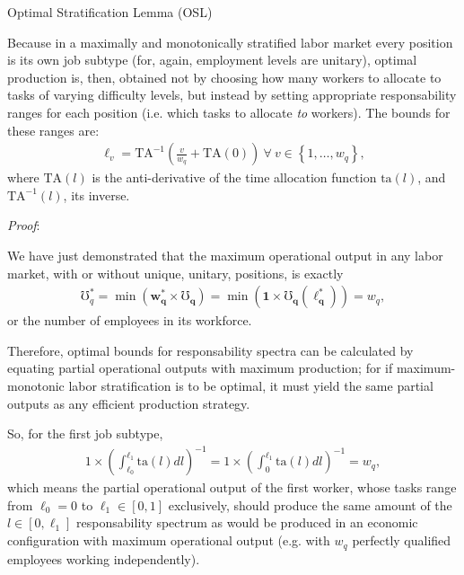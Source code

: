 \documentclass[hidelinks, nonatbib]{elsarticle}
\begin{document}
Optimal Stratification Lemma (OSL)

Because in a maximally and monotonically stratified labor market every position is its own job subtype (for, again, employment levels are unitary), optimal production is, then, obtained not by choosing how many workers to allocate to tasks of varying difficulty levels, but instead by setting appropriate responsability ranges for each position (i.e. which tasks to allocate \textit{to} workers). The bounds for these ranges are:
\begin{gather}
\ell_v
=
\text{TA}^{-1}\left(
    \frac{v}{w_q}
    +
    \text{TA}(0)
\right)
\
\forall
\
v \in 
\left\{
    1, \dots, w_q
\right\}
,
\end{gather}
where $\text{TA}(l)$ is the anti-derivative of the time allocation function $\text{ta}(l)$, and $\text{TA}^{-1}(l)$, its inverse.

\textit{Proof}:

We have just demonstrated that the maximum operational output in any labor market, with or without unique, unitary, positions, is exactly 
\begin{gather}
\mho_{q}^{*}
    =
    \min(
        \boldsymbol{w_{q}^{*}}
        \times
        \boldsymbol{\mho_q}
    )
    = 
    \min(
        \boldsymbol{1}
        \times
        \boldsymbol{\mho_q}(
            \boldsymbol{\ell_{q}^{*}}
        )
    )
    =
    w_q
,
\end{gather}
or the number of employees in its workforce.

Therefore, optimal bounds for responsability spectra can be calculated by equating partial operational outputs with maximum production; for if maximum-monotonic labor stratification is to be optimal, it must yield the same partial outputs as any efficient production strategy.

So, for the first job subtype,
\begin{gather}
1 \times \left(
    \int_{\ell_0}^{\ell_1}
    \text{ta}(l)
    dl
\right) ^ {-1}
=
1 \times \left(
    \int_{0}^{\ell_1}
    \text{ta}(l)
    dl
\right) ^ {-1}
=
w_q
,
\end{gather}
which means the partial operational output of the first worker, whose tasks range from $\ell_0 = 0$ to $\ell_1 \in [0,1]$ exclusively, should produce the same amount of the $l \in [0,\ell_1]$ responsability spectrum as would be produced in an economic configuration with maximum operational output (e.g. with $w_q$ perfectly qualified employees working independently).
\end{document}
